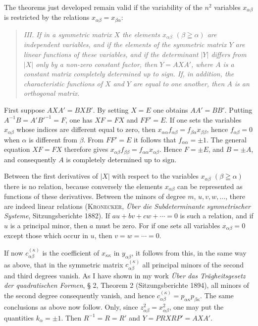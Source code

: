 \documentclass[11pt]{article}
\begin{document}
The theorems just developed remain valid if the variability of the $n^2$ variables $x_{\alpha\beta}$ is restricted by the relations $x_{\alpha\beta}=x_{\beta\alpha}$:

\begin{quote}\itshape
III. If in a symmetric matrix $X$ the elements $x_{\alpha\beta}$ $(\beta\geqq\alpha)$ are independent variables, and if the elements of the symmetric matrix $Y$ are linear functions of these variables, and if the determinant $|Y|$ differs from $|X|$ only by a non-zero constant factor, then $Y=AXA'$, where $A$ is a constant matrix completely determined up to sign. If, in addition, the characteristic functions of $X$ and $Y$ are equal to one another, then $A$ is an orthogonal matrix.
\end{quote}

First suppose $AXA'=BXB'$. By setting $X=E$ one obtains $AA'=BB'$. Putting $A^{-1}B=A'B'^{-1}=F$, one has $XF=FX$ and $FF'=E$. If one sets the variables $x_{\alpha\beta}$ whose indices are different equal to zero, then $x_{\alpha\alpha}f_{\alpha\beta}=f_{\beta\alpha}x_{\beta\beta}$, hence $f_{\alpha\beta}=0$ when $\alpha$ is different from $\beta$. From $FF'=E$ it follows that $f_{\alpha\alpha}=\pm1$. The general equation $XF=FX$ therefore gives $x_{\alpha\beta}f_{\beta\beta}=f_{\alpha\alpha}x_{\alpha\beta}$. Hence $F=\pm E$, and $B=\pm A$, and consequently $A$ is completely determined up to sign.

Between the first derivatives of $|X|$ with respect to the variables $x_{\alpha\beta}$ $(\beta\geqq\alpha)$ there is no relation, because conversely the elements $x_{\alpha\beta}$ can be represented as functions of these derivatives. Between the minors of degree $m$, $u,v,w,\ldots$, there are indeed linear relations (\textsc{Kronecker}, \emph{Über die Subdeterminante symmetrischer Systeme}, Sitzungsberichte 1882). If $au+bv+cw+\cdots=0$ is such a relation, and if $u$ is a principal minor, then $a$ must be zero. For if one sets all variables $x_{\alpha\beta}=0$ except those which occur in $u$, then $v=w=\cdots=0$.

If now $c_{\alpha\beta}^{(\kappa)}$ is the coefficient of $x_{\kappa\kappa}$ in $y_{\alpha\beta}$, it follows from this, in the same way as above, that in the symmetric matrix $c_{\alpha\beta}^{(\kappa)}$ all principal minors of the second and third degrees vanish. As I have shown in my work \emph{Über das Trägheitsgesetz der quadratischen Formen}, § 2, Theorem 2 (Sitzungsberichte 1894), all minors of the second degree consequently vanish, and hence $c_{\alpha\beta}^{(\kappa)}=p_{\alpha\kappa}p_{\beta\kappa}$. The same conclusions as above now follow. Only, since $z_{\alpha\beta}^2=x_{\alpha\beta}^2$, one may put the quantities $k_\alpha=\pm1$. Then $R^{-1}=R=R'$ and $Y=PRXRP'=AXA'$.
\end{document}
